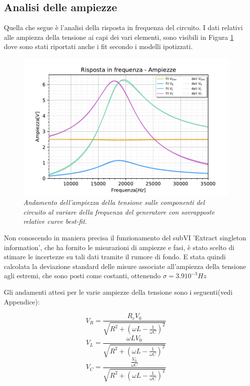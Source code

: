 \subsection{Analisi delle ampiezze}

Quella che segue è l'analisi della risposta in frequenza del circuito.
I dati relativi alle ampiezza della tensione ai capi dei vari elementi, sono visibili in Figura \ref{fig:ampiezzeRLC}
dove sono stati riportati anche i fit secondo i modelli ipotizzati.

\begin{figure}[h]
    \centering
    \includegraphics[width=.8\textwidth]{../figs/Risposta-in-frequenza-ampiezze.pdf}
    \caption{\emph{Andamento dell’ampiezza della tensione sulle componenti del circuito al variare
    della frequenza del generatore con sovrapposte relative curve best-fit.}}
    \label{fig:ampiezzeRLC}
\end{figure}
Non conoscendo in maniera precisa il funzionamento del subVI 'Extract singleton information', che ha fornito le misurazioni
di ampiezze e fasi, è stato scelto di stimare le incertezze su tali dati tramite il rumore di fondo. E stata quindi
calcolata la deviazione standard delle misure associate all’ampiezza della tensione agli estremi, che sono posti
come costanti, ottenendo $\sigma = 3.9 10^{-3} Hz$

Gli andamenti attesi per le varie ampiezze della tensione sono i seguenti(vedi Appendice):

\begin{equation}\label{eq:amp-V_R}
    V_R = \frac{R_rV_0}{\sqrt{ R^2 +{ \left(\omega L - \frac{1}{\omega C}\right)}^2}}
\end{equation}
\begin{equation}
    V_L = \frac{\omega L V_0}{\sqrt{R^2+{ \left(\omega L - \frac{1}{\omega C}\right)}^2}}
\end{equation}
\begin{equation}
    V_C = \frac{\frac{V_0}{\omega C}}{\sqrt{R^2+{ \left(\omega L - \frac{1}{\omega C}\right)}^2}}
\end{equation}


